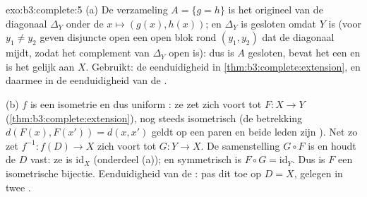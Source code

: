 \begin{solution}{exo:b3:complete:5}
(a) De verzameling $A = \{g = h\}$ is het origineel van de
diagonaal $\Delta_Y$ onder de  $x \mapsto (g(x), h(x))$;
en $\Delta_Y$ is gesloten omdat $Y$  is (voor $y_1 \neq
y_2$ geven disjuncte open  een open blok rond $(y_1,
y_2)$ dat de diagonaal mijdt, zodat het complement van $\Delta_Y$
open is): dus is $A$ gesloten, bevat het een  en
is het gelijk aan $X$. Gebruikt: de eenduidigheid in
\cref{thm:b3:complete:extension}, en daarmee in de eenduidigheid
van de .

(b) $f$ is een isometrie en dus uniform : ze zet zich voort
tot $F\colon X \to Y$ (\cref{thm:b3:complete:extension}), nog
steeds isometrisch (de betrekking $d(F(x), F(x')) = d(x, x')$
geldt op een  paren en beide leden zijn
). Net zo zet $f^{-1}\colon f(D) \to X$ zich voort tot $G
\colon Y \to X$. De samenstelling $G \circ F$ is  en houdt
de  $D$ vast: ze is $\mathrm{id}_X$ (onderdeel (a)); en
symmetrisch is $F \circ G = \mathrm{id}_Y$. Dus is $F$ een
isometrische bijectie. Eenduidigheid van de : pas
dit toe op $D = X$,  gelegen in twee .
\end{solution}

